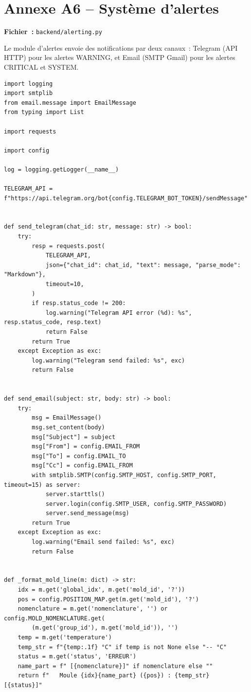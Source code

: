 \section{Annexe A6 -- Système d'alertes}
\label{annexe:alerting}

\textbf{Fichier~:} \texttt{backend/alerting.py}

Le module d'alertes envoie des notifications par deux canaux~: Telegram (API HTTP) pour les alertes WARNING, et Email (SMTP Gmail) pour les alertes CRITICAL et SYSTEM.

\begin{lstlisting}
import logging
import smtplib
from email.message import EmailMessage
from typing import List

import requests

import config

log = logging.getLogger(__name__)

TELEGRAM_API = f"https://api.telegram.org/bot{config.TELEGRAM_BOT_TOKEN}/sendMessage"


def send_telegram(chat_id: str, message: str) -> bool:
    try:
        resp = requests.post(
            TELEGRAM_API,
            json={"chat_id": chat_id, "text": message, "parse_mode": "Markdown"},
            timeout=10,
        )
        if resp.status_code != 200:
            log.warning("Telegram API error (%d): %s", resp.status_code, resp.text)
            return False
        return True
    except Exception as exc:
        log.warning("Telegram send failed: %s", exc)
        return False


def send_email(subject: str, body: str) -> bool:
    try:
        msg = EmailMessage()
        msg.set_content(body)
        msg["Subject"] = subject
        msg["From"] = config.EMAIL_FROM
        msg["To"] = config.EMAIL_TO
        msg["Cc"] = config.EMAIL_FROM
        with smtplib.SMTP(config.SMTP_HOST, config.SMTP_PORT, timeout=15) as server:
            server.starttls()
            server.login(config.SMTP_USER, config.SMTP_PASSWORD)
            server.send_message(msg)
        return True
    except Exception as exc:
        log.warning("Email send failed: %s", exc)
        return False


def _format_mold_line(m: dict) -> str:
    idx = m.get('global_idx', m.get('mold_id', '?'))
    pos = config.POSITION_MAP.get(m.get('mold_id'), '?')
    nomenclature = m.get('nomenclature', '') or config.MOLD_NOMENCLATURE.get(
        (m.get('group_id'), m.get('mold_id')), '')
    temp = m.get('temperature')
    temp_str = f"{temp:.1f} °C" if temp is not None else "-- °C"
    status = m.get('status', 'ERREUR')
    name_part = f" [{nomenclature}]" if nomenclature else ""
    return f"   Moule {idx}{name_part} ({pos}) : {temp_str} [{status}]"



\end{lstlisting}
